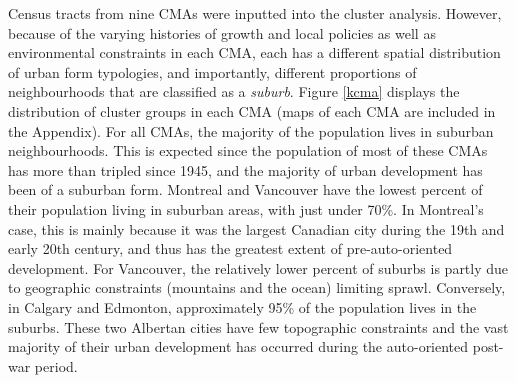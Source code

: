 Census tracts from nine CMAs were inputted into the cluster analysis. However, because of the varying histories of growth and local policies as well as environmental constraints in each CMA, each has a different spatial distribution of urban form typologies, and importantly, different proportions of neighbourhoods that are classified as a \textit{suburb}. Figure \ref{kcma} displays the distribution of cluster groups in each CMA (maps of each CMA are included in the Appendix). For all CMAs, the majority of the population lives in suburban neighbourhoods. This is expected since the population of most of these CMAs has more than tripled since 1945, and the majority of urban development has been of a suburban form. Montreal and Vancouver have the lowest percent of their population living in suburban areas, with just under 70\%. In Montreal's case, this is mainly because it was the largest Canadian city during the 19th and early 20th century, and thus has the greatest extent of pre-auto-oriented development. For Vancouver, the relatively lower percent of suburbs is partly due to geographic constraints (mountains and the ocean) limiting sprawl. Conversely, in Calgary and Edmonton, approximately 95\% of the population lives in the suburbs. These two Albertan cities have few topographic constraints and the vast majority of their urban development has occurred during the auto-oriented post-war period.










